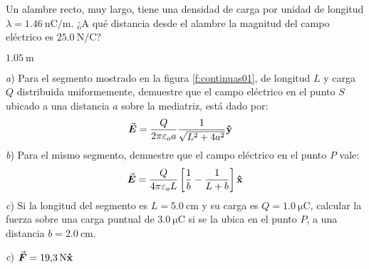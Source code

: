\setcounter{figure}{0}

\begin{Exercise}
  Un alambre recto, muy largo, tiene una densidad de carga por unidad de longitud $\lambda = \SI{1.46}{\nano\coulomb/\metre}$. ¿A qué distancia desde el alambre la magnitud del campo eléctrico es $\SI{25.0}{\newton/\coulomb}$?
\end{Exercise}
\begin{Answer}
  $\SI{1.05}{\metre}$
\end{Answer}
%
\begin{Exercise}\label{p:continuas01}
  \textit{a}) Para el segmento mostrado en la figura \ref{f:continuas01}, de longitud $L$ y carga $Q$ distribuida uniformemente, demuestre que el campo eléctrico en el punto $S$ ubicado a una distancia $a$ sobre la mediatriz, está dado por:
  \begin{align*}
    \va*{E} &= \frac{Q}{2\pi\varepsilon_o a} \frac{1}{\sqrt{L^2+4a^2}}\vu{y}
  \end{align*}
  \textit{b}) Para el mismo segmento, demuestre que el campo eléctrico en el punto $P$ vale:
  \begin{align*}
    \va*{E} = \frac{Q}{4\pi\varepsilon_o L} \left \lbrack \frac{1}{b} - \frac{1}{L+b} \right \rbrack \vu{x}
  \end{align*}
  \textit{c}) Si la longitud del segmento es $L = \SI{5.0}{\centi\metre}$ y su carga es $Q = \SI{1.0}{\micro\coulomb}$, calcular la fuerza sobre una carga puntual de $\SI{3.0}{\micro\coulomb}$ si se la ubica en el punto $P$, a una distancia $b = \SI{2.0}{\centi\metre}$.
\end{Exercise}
\begin{Answer}
  \textit{c}) $\va*{F} = \SI{19.3}{\newton}\vu{x}$
\end{Answer}
%
\begin{center}
\end{center}
